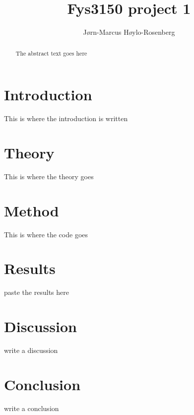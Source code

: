 \documentclass{article}
\begin{document}
\author{Jørn-Marcus Høylo-Rosenberg}
\title{Fys3150 project 1}
\maketitle
\newpage

\begin{abstract}
The abstract text goes here
\end{abstract}

\section*{Introduction}
This is where the introduction is written

\section*{Theory}
This is where the theory goes

\section*{Method}
This is where the code goes

\section*{Results}
paste the results here

\section*{Discussion}
write a discussion

\section*{Conclusion}
write a conclusion
\end{document}
